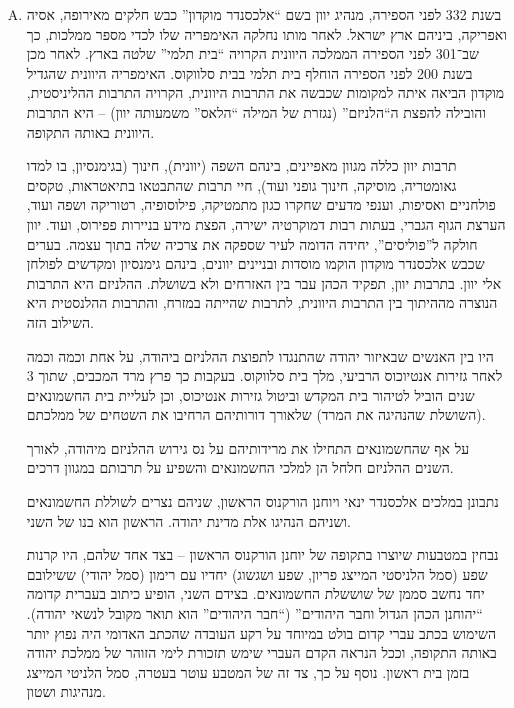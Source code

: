 \documentclass[]{article}
\makeatletter
\newcommand{\skipitems}[1]{
    \addtocounter{\@enumctr}{#1}
}
\makeatother
\begin{document}
    \begin{enumerate}[A.]
        \skipitems{1}
        
        \item בשנת 332 לפני הספירה, מנהיג יוון בשם ``אלכסנדר מוקדון'' כבש חלקים מאירופה, אסיה ואפריקה, ביניהם ארץ ישראל. לאחר מותו נחלקה האימפריה שלו לכדי מספר ממלכות, כך שב־301 לפני הספירה הממלכה היוונית הקרויה ``בית תלמי'' שלטה בארץ. לאחר מכן בשנת 200 לפני הספירה הוחלף בית תלמי בבית סלווקוס. האימפריה היוונית שהגדיל מוקדון הביאה איתה למקומות שכבשה את התרבות היוונית, הקרויה התרבות ההליניסטית, והובילה להפצת ה``הלניזם'' (נגזרת של המילה ``הלאס'' משמעותה יוון) – היא התרבות היוונית באותה התקופה. 
        
        תרבות יוון כללה מגוון מאפיינים, בינהם השפה (יוונית), חינוך (בגימנסיון, בו למדו גאומטריה, מוסיקה, חינוך גופני ועוד), חיי תרבות שהתבטאו בתיאטראות, טקסים פולחניים ואסיפות, וענפי מדעים שחקרו כגון מתמטיקה, פילוסופיה, רטוריקה ושפה ועוד, הערצת הגוף הגברי, בעתות רבות דמוקרטיה ישירה, הפצת מידע בניירות פפירוס, ועוד. יוון חולקה ל''פוליסים'', יחידה הדומה לעיר שספקה את צרכיה שלה בתוך עצמה. בערים שכבש אלכסנדר מוקדון הוקמו מוסדות ובניינים יוונים, בינהם גימנסיון ומקדשים לפולחן אלי יוון. בתרבות יוון, תפקיד הכהן עבר בין האזרחים ולא בשושלת. ההלניזם היא התרבות הנוצרה מההיתוך בין התרבות היוונית, לתרבות שהייתה במזרח, והתרבות ההלנסטית היא השילוב הזה. 
        
        היו בין האנשים שבאיזור יהודה שהתנגדו לתפוצת ההלניזם ביהודה, על אחת וכמה וכמה לאחר גזירות אנטיוכוס הרביעי, מלך בית סלווקוס. בעקבות כך פרץ מרד המכבים, שתוך 3 שנים הוביל לטיהור בית המקדש וביטול גזירות אנטיכוס, וכן לעליית בית החשמונאים (השושלת שהנהיגה את המרד) שלאורך דורותיהם הרחיבו את השטחים של ממלכתם. 
        
        על אף שהחשמונאים התחילו את מרידותיהם על נס גירוש ההלניזם מיהודה, לאורך השנים ההלניזם חלחל הן למלכי החשמונאים והשפיע על תרבותם במגוון דרכים. 
        
        נתבונן במלכים אלכסנדר ינאי ויוחנן הורקנוס הראשון, שניהם נצרים לשוללת החשמונאים ושניהם הנהיגו אלת מדינת יהודה. הראשון הוא בנו של השני. 
        
        נבחין במטבעות שיוצרו בתקופה של יוחנן הורקנוס הראשון – בצד אחד שלהם, היו קרנות שפע (סמל הלניסטי המייצג פריון, שפע ושגשוג) יחדיו עם רימון (סמל יהודי) ששילובם יחד נחשב סממן של שוששלת החשמונאים. בצידם השני, הופיע כיתוב בעברית קדומה ``יהוחנן הכהן הגדול וחבר היהודים'' (``חבר היהודים'' הוא תואר מקובל לנשאי יהודה). השימוש בכתב עברי קדום בולט במיוחד על רקע העובדה שהכתב האדומי היה נפוץ יותר באותה התקופה, וככל הנראה הקדם העברי שימש תזכורת לימי הזוהר של ממלכת יהודה בזמן בית ראשון. נוסף על כך, צד זה של המטבע עוטר בעטרה, סמל הלניטי המייצג מנהיגות ושטון. 
        

\end{enumerate}
\end{document}
